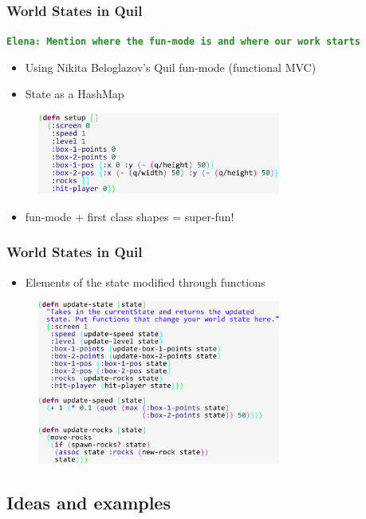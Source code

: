 \documentclass{beamer}
\newcommand{\comment}[1]{{\bf \tt  {#1}}}
\newcommand{\emcomment}[1]{\textcolor{ForestGreen}{\comment{Elena: {#1}}}}
\begin{document}
\begin{frame}
\frametitle{World States in Quil}
\emcomment{Mention where the fun-mode is and where our work starts}
	\begin{itemize}
		\item  Using Nikita Beloglazov's  Quil fun-mode (functional MVC)
		\item State as a HashMap
	\end{itemize}
	\begin{figure}
		\includegraphics[width=8cm]{PresentationImages/setupCode.png}
	\end{figure}
	\begin{itemize}
		\item fun-mode + first class shapes = super-fun!
	\end{itemize}
\end{frame}

\begin{frame}
\frametitle{World States in Quil}
\begin{itemize}
		\item Elements of the state modified through functions
	\end{itemize}
	\begin{figure}
		\includegraphics[width=8cm]{PresentationImages/updateCode.png}
	\end{figure}
\end{frame}




\subsection{Ideas and examples}
\end{document}
